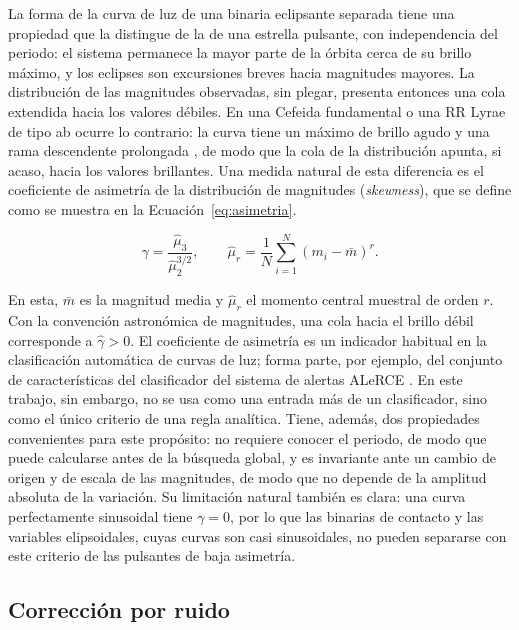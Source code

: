 \documentclass[12pt,letterpaper,oneside]{book}
\begin{document}
La forma de la curva de luz de una binaria eclipsante separada tiene una propiedad que la distingue de la de una estrella pulsante, con independencia del periodo: el sistema permanece la mayor parte de la \'orbita cerca de su brillo m\'aximo, y los eclipses son excursiones breves hacia magnitudes mayores. La distribuci\'on de las magnitudes observadas, sin plegar, presenta entonces una cola extendida hacia los valores d\'ebiles. En una Cefeida fundamental o una RR Lyrae de tipo ab ocurre lo contrario: la curva tiene un m\'aximo de brillo agudo y una rama descendente prolongada \citep{Carroll2017}, de modo que la cola de la distribuci\'on apunta, si acaso, hacia los valores brillantes. Una medida natural de esta diferencia es el coeficiente de asimetr\'ia de la distribuci\'on de magnitudes (\emph{skewness}), que se define como se muestra en la Ecuaci\'on~\eqref{eq:asimetria}.

\begin{equation}
	\hat\gamma = \frac{\hat\mu_3}{\hat\mu_2^{3/2}}, \qquad \hat\mu_r = \frac{1}{N}\sum_{i=1}^{N}\left(m_i - \bar m\right)^r.
	\label{eq:asimetria}
\end{equation}

En esta, $\bar m$ es la magnitud media y $\hat\mu_r$ el momento central muestral de orden $r$. Con la convenci\'on astron\'omica de magnitudes, una cola hacia el brillo d\'ebil corresponde a $\hat\gamma>0$. El coeficiente de asimetr\'ia es un indicador habitual en la clasificaci\'on autom\'atica de curvas de luz; forma parte, por ejemplo, del conjunto de caracter\'isticas del clasificador del sistema de alertas ALeRCE \citep{SanchezSaez2021}. En este trabajo, sin embargo, no se usa como una entrada m\'as de un clasificador, sino como el \'unico criterio de una regla anal\'itica. Tiene, adem\'as, dos propiedades convenientes para este prop\'osito: no requiere conocer el periodo, de modo que puede calcularse antes de la b\'usqueda global, y es invariante ante un cambio de origen y de escala de las magnitudes, de modo que no depende de la amplitud absoluta de la variaci\'on. Su limitaci\'on natural tambi\'en es clara: una curva perfectamente sinusoidal tiene $\gamma=0$, por lo que las binarias de contacto y las variables elipsoidales, cuyas curvas son casi sinusoidales, no pueden separarse con este criterio de las pulsantes de baja asimetr\'ia.

\subsection{Correcci\'on por ruido}
\end{document}
